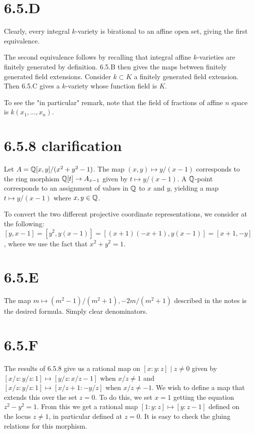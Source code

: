 \documentclass{article}
\begin{document}
\section{6.5.D}
Clearly, every integral $k$-variety is birational to an
affine open set, giving the first equivalence.

The second equivalence follows by recalling that integral affine
$k$-varieties are finitely generated by definition. 6.5.B
then gives the maps between finitely generated field extensions. Consider
$k \subset K$ a finitely generated field extension. Then 6.5.C gives
a $k$-variety whose function field is
$K$.

To see the "in particular" remark, note that the field of fractions of affine
$n$ space is $k(x_1,\dots, x_n)$.

\section{6.5.8 clarification}
Let $A=\mathbb{Q}[x,y]/(x^2+y^2-1)$. The map $(x, y) \mapsto y/(x-1)$ corresponds to the
ring morphism $\mathbb{Q}[t] \to A_{x-1}$ given by $t \mapsto y/(x-1)$. A
$\mathbb{Q}$-point corresponds to an assignment of values in
$\mathbb{Q}$ to $x$ and $y$,
yielding a map $t \mapsto y/(x-1)$ where $x, y \in \mathbb{Q}$.

To convert the two different projective coordinate representations, we consider
at the following: $[y, x-1]=[y^2, y(x-1)]=[(x+1)(-x+1),
    y(x-1)]=[x+1, -y]$, where we use the fact that
$x^2+y^2=1$.

\section{6.5.E}
The map $m \mapsto (m^2-1)/(m^2+1), -2m/(m^2+1)$ described in the notes is the desired formula.
Simply clear denominators.

\section{6.5.F}
The results of 6.5.8 give us a rational map on ${[x : y : z] \mid z \neq 0}$ given by
$[x/z : y/z : 1] \mapsto [y/z : x/z-1]$ when $x/z \neq 1$ and
$[x/z : y/z : 1] \mapsto [x/z+1 : -y/z]$ when $x/z \neq -1$. We wish to define a map
that extends this over the set $z=0$. To do this, we set
$x=1$ getting the equation $z^2-y^2=1$. From this
we get a rational map $[1 : y : z] \mapsto [y : z-1]$ defined on the locus
$z \neq 1$, in particular defined at $z=0$. It
is easy to check the gluing relations for this morphism.
\end{document}
